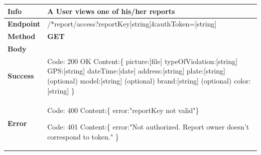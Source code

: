 \begin{table}[H]
\begin{tabular}{|l|p{}|}
\hline
\textbf{Info}             & A User views one of his/her reports                                                              \\ \hline
\textbf{Endpoint}    &  /*report/access?reportKey[string]\&authToken=[string] \\ \hline
\textbf{Method}         &   \textbf{GET}                                                                            \\ \hline

\textbf{Body}  & 
                    \\ \hline
                    
\textbf{Success} &  Code: 200 OK \newline
                    Content:\{\newline 
                   picture:[file]\newline
         typeOfViolation:[string]\newline
                   GPS:[string]\newline
                   dateTime:[date]\newline
                   address:[string]\newline
                   plate:[string]\newline
                   (optional) model:[string]\newline
                   (optional) brand:[string]\newline
                   (optional) color:[string]\newline
                    \}\\ \hline
\textbf{Error} &  Code: 400 \newline
                  Content:\{\newline
                  error:"reportKey not valid"\newline\}\newline
                  
                  
                  Code: 401 \newline
                  Content:\{\newline
                  error:"Not authorized. Report owner doesn't correspond to token." \newline\}
                 
                  
                \\\hline

\end{tabular}
\end{table}



